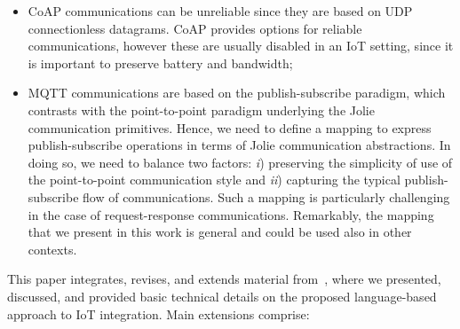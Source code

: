 \begin{itemize}
 \item CoAP communications can be unreliable since they are based on UDP
       connectionless datagrams. CoAP provides options for reliable
       communications, however these are usually disabled in an IoT setting,
       since it is important to preserve battery and bandwidth;

 \item MQTT communications are based on the publish-subscribe paradigm, which
       contrasts with the point-to-point paradigm underlying the Jolie
       communication primitives. Hence, we need to define a mapping to express
       publish-subscribe operations in terms of Jolie communication abstractions. In doing so, we need to balance two factors:
       \emph{i}) preserving the simplicity of use of the point-to-point
       communication style and \emph{ii}) capturing the typical
       publish-subscribe flow of communications. Such a mapping is particularly
       challenging in the case of request-response communications. Remarkably,
       the mapping that we present in this work is general and could be used
       also in other contexts.
\end{itemize}

This paper integrates, revises, and extends material
from~\cite{GabbrielliGLZ18}, where we presented, discussed, and provided basic
technical details on the proposed language-based approach to IoT integration.
Main extensions comprise:


